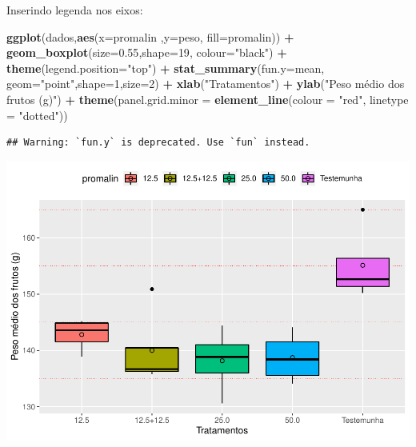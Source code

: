 \documentclass[
]{book}
\newenvironment{Shaded}{\begin{snugshade}}{\end{snugshade}}
\newcommand{\DataTypeTok}[1]{\textcolor[rgb]{0.13,0.29,0.53}{#1}}
\newcommand{\DecValTok}[1]{\textcolor[rgb]{0.00,0.00,0.81}{#1}}
\newcommand{\FloatTok}[1]{\textcolor[rgb]{0.00,0.00,0.81}{#1}}
\newcommand{\KeywordTok}[1]{\textcolor[rgb]{0.13,0.29,0.53}{\textbf{#1}}}
\newcommand{\NormalTok}[1]{#1}
\newcommand{\OperatorTok}[1]{\textcolor[rgb]{0.81,0.36,0.00}{\textbf{#1}}}
\newcommand{\StringTok}[1]{\textcolor[rgb]{0.31,0.60,0.02}{#1}}
\begin{document}
Inserindo legenda nos eixos:

\begin{Shaded}
\begin{Highlighting}[]
\KeywordTok{ggplot}\NormalTok{(dados,}\KeywordTok{aes}\NormalTok{(}\DataTypeTok{x=}\NormalTok{promalin ,}\DataTypeTok{y=}\NormalTok{peso, }\DataTypeTok{fill=}\NormalTok{promalin)) }\OperatorTok{+}\StringTok{ }
\StringTok{      }\KeywordTok{geom_boxplot}\NormalTok{(}\DataTypeTok{size=}\FloatTok{0.55}\NormalTok{,}\DataTypeTok{shape=}\DecValTok{19}\NormalTok{, }\DataTypeTok{colour=}\StringTok{"black"}\NormalTok{) }\OperatorTok{+}\StringTok{ }
\StringTok{      }\KeywordTok{theme}\NormalTok{(}\DataTypeTok{legend.position=}\StringTok{"top"}\NormalTok{) }\OperatorTok{+}\StringTok{ }
\StringTok{      }\KeywordTok{stat_summary}\NormalTok{(}\DataTypeTok{fun.y=}\NormalTok{mean, }\DataTypeTok{geom=}\StringTok{"point"}\NormalTok{,}\DataTypeTok{shape=}\DecValTok{1}\NormalTok{,}\DataTypeTok{size=}\DecValTok{2}\NormalTok{) }\OperatorTok{+}\StringTok{ }
\StringTok{      }\KeywordTok{xlab}\NormalTok{(}\StringTok{"Tratamentos"}\NormalTok{) }\OperatorTok{+}\StringTok{  }
\StringTok{      }\KeywordTok{ylab}\NormalTok{(}\StringTok{"Peso médio dos frutos (g)"}\NormalTok{)  }\OperatorTok{+}
\StringTok{      }\KeywordTok{theme}\NormalTok{(}\DataTypeTok{panel.grid.minor =} \KeywordTok{element_line}\NormalTok{(}\DataTypeTok{colour =} \StringTok{"red"}\NormalTok{, }\DataTypeTok{linetype =} \StringTok{"dotted"}\NormalTok{)) }
\end{Highlighting}
\end{Shaded}

\begin{verbatim}
## Warning: `fun.y` is deprecated. Use `fun` instead.
\end{verbatim}

\includegraphics{TudodoR_files/figure-latex/unnamed-chunk-236-1.pdf}
\end{document}
